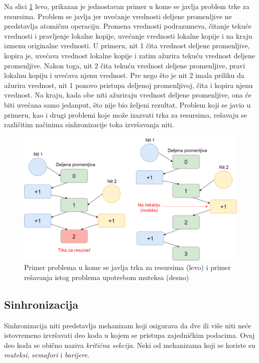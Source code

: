 \documentclass[12pt,oneside]{memoir}
\begin{document}
Na slici \ref{fig:race} levo, prikazan je jednostavan primer u kome se javlja problem trke za resursima. Problem se javlja jer uvećanje vrednosti deljene promenljive ne predstavlja atomičnu operaciju. Promena vrednosti podrazumeva, čitanje tekuće vrednosti i pravljenje lokalne kopije, uvećanje vrednosti lokalne kopije i na kraju izmenu originalne vrednosti. U primeru, nit 1 čita vrednost deljene promenljive, kopira je, uvećava vrednost lokalne kopije i zatim ažurira tekuću vrednost deljene promenljive. Nakon toga, nit 2 čita tekuću vrednost deljene promenljive, pravi lokalnu kopiju i uvećava njenu vrednost. Pre nego što je nit 2 imala priliku da ažurira vrednost, nit 1 ponovo pristupa deljenoj promenljivoj, čita i kopira njenu vrednost. Na kraju, kada obe niti ažuriraju vrednost deljene promenljive, ona će biti uvećana samo jedanput, što nije bio željeni rezultat. Problem koji se javio u primeru, kao i drugi problemi koje može izazvati trka za resursima, rešavaju se različitim načinima sinhronizacije toka izvršavanja niti.

\begin{figure}
\begin{center}
\includegraphics[scale=0.22]{race.png}
\end{center}
\caption{Primer problema u kome se javlja trka za resursima (levo) i primer rešavanja istog problema upotrebom muteksa (desno) }
\label{fig:race}
\end{figure}

\subsection{Sinhronizacija}

Sinhronizacija niti predstavlja mehanizam koji osigurava da dve ili više niti neće istovremeno izvršavati deo koda u kojem se pristupa zajedničkim podacima. Ovaj deo koda se obično naziva \textit{kritična sekcija}.  Neki od mehanizama koji se koriste su \textit{muteksi}, \textit{semafori} i \textit{barijere}. 
\end{document}

